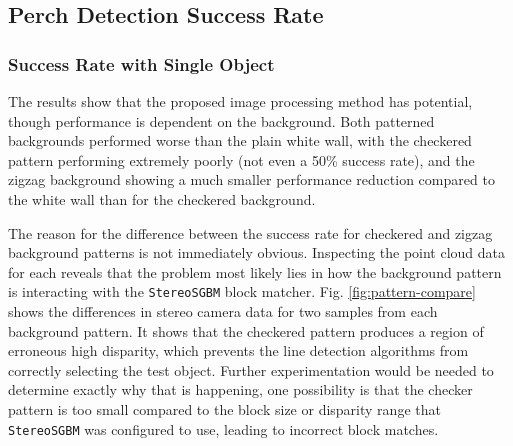 \subsection{Perch Detection Success Rate}

\subsubsection{Success Rate with Single Object}

The results show that the proposed image processing method has potential, though performance is dependent on the background.
Both patterned backgrounds performed worse than the plain white wall, with the checkered pattern performing extremely poorly (not
even a 50\% success rate), and the zigzag background showing a much smaller performance reduction compared to the white wall than 
for the checkered background.

The reason for the difference between the success rate for checkered and zigzag background patterns is not immediately obvious. 
Inspecting the point cloud data for each reveals that the problem most likely lies in how the background pattern is interacting 
with the \texttt{StereoSGBM} block matcher. Fig. \ref{fig:pattern-compare} shows the differences in stereo camera data for two samples
from each background pattern. It shows that the checkered pattern produces a region of erroneous high disparity, which prevents the 
line detection algorithms from correctly selecting the test object. Further experimentation would be needed to determine exactly 
why that is happening, one possibility is that the checker pattern is too small compared to the block size or disparity range
that \texttt{StereoSGBM} was configured to use, leading to incorrect block matches.

